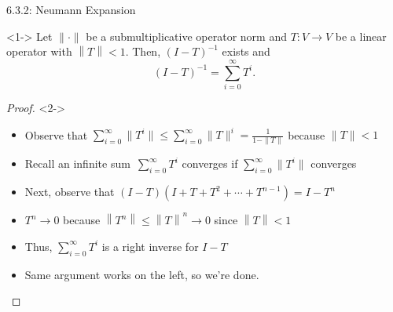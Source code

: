 \documentclass[10pt,letterpaper,english]{beamer}
\begin{document}
\begin{frame}{6.3.2: Neumann Expansion}

\vspace{-1mm}

\begin{theorem}<1->
Let $\| \cdot \|$ be a submultiplicative operator norm and $T \colon V \rightarrow V$ be a linear operator with $\left\| T \right\| < 1$.
Then, $(I-T)^{-1}$ exists and \vspace{-2mm}
\[ (I-T)^{-1} = \sum_{i=0}^{\infty} T^i. \]
\end{theorem}
\begin{proof}<2->
\begin{itemize}
\item<2-> Observe that $\sum_{i=0}^{\infty} \| T^i \| \leq \sum_{i=0}^{\infty} \| T \|^i = \frac{1}{1-\|T\|}$ because $\|T\|<1$ \vspace{1mm}

\item<3-> Recall an infinite sum $\,\sum_{i=0}^{\infty} T^i$ converges if $\sum_{i=0}^{\infty} \| T^i \|$ converges \vspace{1mm}

\item<4-> Next, observe that $(I - T) \left( I + T + T^2 + \cdots + T^{n-1} \right) = I - T^n $ \vspace{1mm}

\item<5-> $T^n \to 0$ because $ \left\| T^n \right\| \leq \left\| T \right\|^n \rightarrow 0$ since $\left\| T \right\| < 1$ \vspace{1mm}

\item<6-> Thus, $\sum_{i=0}^{\infty} T^i$ is a right inverse for $I-T$ \vspace{1mm}

\item<7-> Same argument works on the left, so we're done. \hfill \qedhere

\end{itemize}
\end{proof}

\end{frame}
\end{document}

